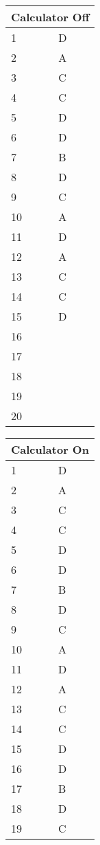 \documentclass[10pt,twoside]{article}
\begin{document}
\begin{multicols}{2} 
\begin{center} 
\begin{tabularx}{0.6\columnwidth}{p{1cm}X} 
\multicolumn{2}{l}{Calculator Off} \\ 
\toprule 
1 & D \\ 
2 & A \\ 
3 & C \\ 
4 & C \\ 
5 & D \\ 
6 & D \\ 
7 & B \\ 
8 & D \\ 
9 & C \\ 
10 & A \\ 
11 & D \\ 
12 & A \\ 
13 & C \\ 
14 & C \\ 
15 & D \\ 
\midrule 
16 &  \\ 
17 &  \\ 
18 &  \\ 
19 &  \\ 
20 &  \\ 
\bottomrule 
\end{tabularx} 
\end{center} 
\vfill
\columnbreak
\begin{center} 
\begin{tabularx}{0.6\columnwidth}{p{1cm}X} 
\multicolumn{2}{l}{Calculator On} \\ 
\toprule 
1 & D \\ 
2 & A \\ 
3 & C \\ 
4 & C \\ 
5 & D \\ 
6 & D \\ 
7 & B \\ 
8 & D \\ 
9 & C \\ 
10 & A \\ 
11 & D \\ 
12 & A \\ 
13 & C \\ 
14 & C \\ 
15 & D \\ 
16 & D \\ 
17 & B \\ 
18 & D \\ 
19 & C \\ 

\end{tabularx}
\end{center}
\end{multicols}
\end{document}
